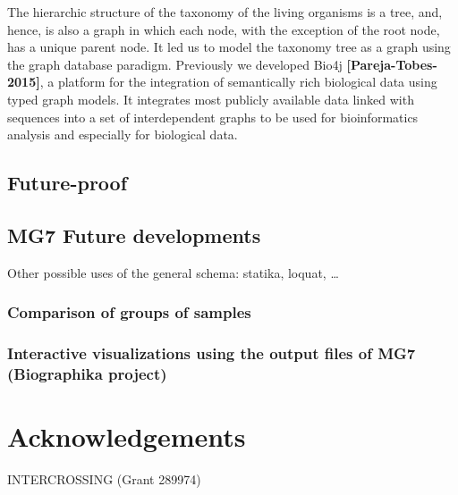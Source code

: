\documentclass{frontiersSCNS} %
\begin{document}
The hierarchic structure of the taxonomy of the living organisms is a
tree, and, hence, is also a graph in which each node, with the exception
of the root node, has a unique parent node. It led us to model the
taxonomy tree as a graph using the graph database paradigm. Previously
we developed Bio4j \textbf{{[}Pareja-Tobes-2015{]}}, a platform for the
integration of semantically rich biological data using typed graph
models. It integrates most publicly available data linked with sequences
into a set of interdependent graphs to be used for bioinformatics
analysis and especially for biological data.

\subsection{Future-proof}\label{future-proof}

\subsection{MG7 Future developments}\label{mg7-future-developments}

Other possible uses of the general schema: statika, loquat, \ldots{}

\subsubsection{Comparison of groups of
samples}\label{comparison-of-groups-of-samples}

\subsubsection{Interactive visualizations using the output files of MG7
(Biographika
project)}\label{interactive-visualizations-using-the-output-files-of-mg7-biographika-project}

\section{Acknowledgements}\label{acknowledgements}

INTERCROSSING (Grant 289974)


\end{document}
